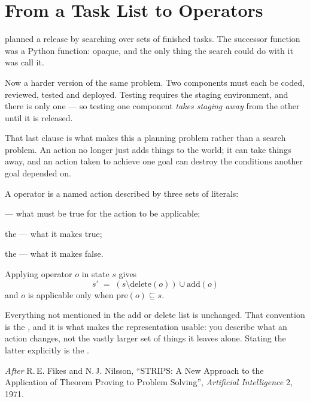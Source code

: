 \section{From a Task List to Operators}

 planned a release by searching over sets of finished tasks. The
successor function was a Python function: opaque, and the only thing the search
could do with it was call it.

Now a harder version of the same problem. Two components must each be coded,
reviewed, tested and deployed. Testing requires the staging environment, and there
is only one --- so testing one component \emph{takes staging away} from the other
until it is released.

That last clause is what makes this a planning problem rather than a search
problem. An action no longer just adds things to the world; it can take things
away, and an action taken to achieve one goal can destroy the conditions another
goal depended on.

\begin{definitionbox}
A  operator is a named action described by three sets of literals:
\begin{tight}
  \item {} --- what must be true for the action to be applicable;
  \item the  --- what it makes true;
  \item the  --- what it makes false.
\end{tight}
Applying operator $o$ in state $s$ gives
\[
  s' \;=\; (s \setminus \mathrm{delete}(o)) \cup \mathrm{add}(o)
\]
and $o$ is applicable only when $\mathrm{pre}(o) \subseteq s$.

Everything not mentioned in the add or delete list is unchanged. That convention is
the , and it is what makes the representation usable: you
describe what an action changes, not the vastly larger set of things it leaves
alone. Stating the latter explicitly is the .

\smallskip
\noindent\emph{After} R.\,E. Fikes and N.\,J. Nilsson, ``STRIPS: A New Approach to
the Application of Theorem Proving to Problem Solving'', \emph{Artificial
Intelligence} 2, 1971.
\end{definitionbox}

